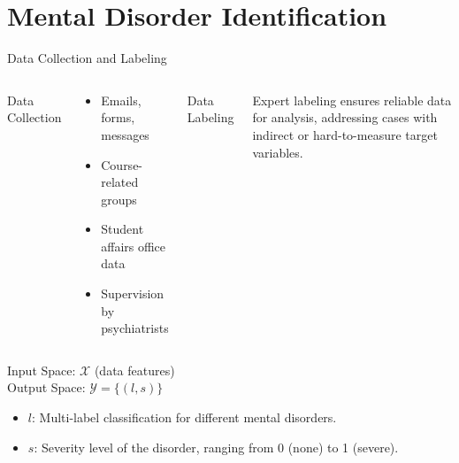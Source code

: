 \documentclass[10pt, xcolor=table]{beamer}
\let\olditem\item
\renewcommand\item{\olditem\justifying}
\begin{document}
\section*{Mental Disorder Identification}

\begin{frame}{Data Collection and Labeling}
	
	\begin{columns}[c]
		\centering
		Data Collection \\
		\vspace{0.3cm}
		\begin{tcolorbox}[width=\linewidth, colback=myNewColorB, colframe=myNewColorA, boxrule=0.7mm, rounded corners]
			\justifying
			\begin{itemize}
				\item Emails, forms, messages
				\item Course-related groups
				\item Student affairs office data
				\item Supervision by psychiatrists
			\end{itemize}
		\end{tcolorbox}
		
		\centering
		Data Labeling \\
		\vspace{0.3cm}
		\begin{tcolorbox}[width=\linewidth, colback=myNewColorB, colframe=myNewColorA, boxrule=0.7mm, rounded corners]
			\justifying
			Expert labeling ensures reliable data for analysis, addressing cases with indirect or hard-to-measure target variables.
		\end{tcolorbox}
	\end{columns}
	
	\vspace{0.5cm}
	\centering
	\vspace{0.3cm}
	Input Space: \( \mathcal{X} \) (data features) \\
	Output Space: \( \mathcal{Y} = \{(l, s)\} \) \\
	\vspace{0.2cm}
	\begin{itemize}
		\item \( l \): Multi-label classification for different mental disorders.
		\item \( s \): Severity level of the disorder, ranging from 0 (none) to 1 (severe).
	\end{itemize}
	
\end{frame}
\end{document}
